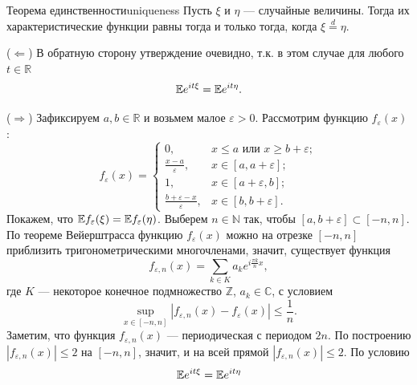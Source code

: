 \begin{theorem}{Теорема единственности}{uniqueness}
    Пусть $\xi$ и $\eta$ --- случайные величины. Тогда их характеристические функции равны тогда и только тогда, когда $\xi \stackrel{d}{=} \eta$.
\end{theorem}
\begin{proofbox}
    ($\Leftarrow$) В обратную сторону утверждение очевидно, т.к. в этом случае для любого $t \in \mathbb{R}$
    \begin{equation*}
        \mathbb{E} e^{it\xi} = \mathbb{E} e^{it\eta}.
    \end{equation*}

    ($\Rightarrow$) Зафиксируем $a, b \in \mathbb{R}$ и возьмем малое $\varepsilon > 0$. Рассмотрим функцию $f_{\varepsilon}(x)$ :
    \begin{equation*}
        f_{\varepsilon}(x) =
        \begin{cases}
            0, & x \leqslant a \text{ или } x \geqslant b + \varepsilon; \\
            \frac{x-a}{\varepsilon}, & x \in [a, a + \varepsilon]; \\
            1, & x \in [a + \varepsilon, b]; \\
            \frac{b+\varepsilon-x}{\varepsilon}, & x \in [b, b + \varepsilon].
        \end{cases}
    \end{equation*}
    Покажем, что $\mathbb{E} f_{\varepsilon}(\xi) = \mathbb{E} f_{\varepsilon}(\eta)$. Выберем $n \in \mathbb{N}$ так, чтобы $[a, b + \varepsilon] \subset [-n, n]$. По теореме Вейерштрасса функцию $f_{\varepsilon}(x)$ можно на отрезке $[-n, n]$ приблизить тригонометрическими многочленами, значит, существует функция
    \begin{equation*}
        f_{\varepsilon,n}(x) = \sum_{k \in K} a_k e^{i \frac{\pi k}{n} x},
    \end{equation*}
    где $K$ --- некоторое конечное подмножество $\mathbb{Z}$, $a_k \in \mathbb{C}$, с условием
    \begin{equation*}
        \sup_{x \in [-n,n]} |f_{\varepsilon,n}(x) - f_{\varepsilon}(x)| \leqslant \frac{1}{n}.
    \end{equation*}
    Заметим, что функция $f_{\varepsilon,n}(x)$ --- периодическая с периодом $2n$. По построению $|f_{\varepsilon,n}(x)| \leqslant 2$ на $[-n, n]$, значит, и на всей прямой $|f_{\varepsilon,n}(x)| \leqslant 2$. По условию
    \begin{equation*}
        \mathbb{E} e^{it\xi} = \mathbb{E} e^{it\eta}
    \end{equation*}

\end{proofbox}

